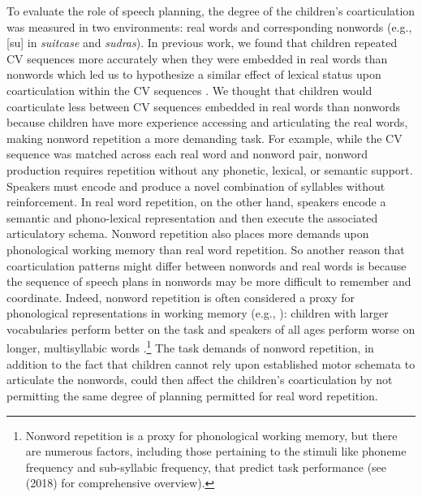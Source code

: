 \documentclass[a4paper,man,natbib,donotrepeattitle, apacite]{apa6}
\begin{document}
To evaluate the role of speech planning, the degree of the children’s coarticulation was measured in two environments: real words and corresponding nonwords (e.g., [su] in \textit{suitcase} and \textit{sudras}). In previous work, we found that children repeated CV sequences more accurately when they were embedded in real words than nonwords which led us to hypothesize a similar effect of lexical status upon coarticulation within the CV sequences \cite{cychoszLexicalAdvantageFouryearold2020}. We thought that children would coarticulate less between CV sequences embedded in real words than nonwords because children have more experience accessing and articulating the real words, making nonword repetition a more demanding task. For example, while the CV sequence was matched across each real word and nonword pair, nonword production requires repetition without any phonetic, lexical, or semantic support. Speakers must encode and produce a novel combination of syllables without reinforcement. In real word repetition, on the other hand, speakers encode a semantic and phono-lexical representation and then execute the associated articulatory schema. Nonword repetition also places more demands upon phonological working memory than real word repetition. So another reason that coarticulation patterns might differ between nonwords and real words is because the sequence of speech plans in nonwords may be more difficult to remember and coordinate. Indeed, nonword repetition is often considered a proxy for phonological representations in working memory (e.g., ): children with larger vocabularies perform better on the task \cite{edwardsInteractionVocabularySize2004,munsonRelationshipsNonwordRepetition2005} and speakers of all ages perform worse on longer, multisyllabic words \cite{byrdNonwordRepetitionPhoneme2012}.\footnote{Nonword repetition is a proxy for phonological working memory, but there are numerous factors, including those pertaining to the stimuli like phoneme frequency and sub-syllabic frequency, that predict task performance (see \citeauthor{szewczykNonwordRepetitionDepends2018} (2018) for comprehensive overview).} The task demands of nonword repetition, in addition to the fact that children cannot rely upon established motor schemata to articulate the nonwords, could then affect the children’s coarticulation by not permitting the same degree of planning permitted for real word repetition. 
\end{document}
